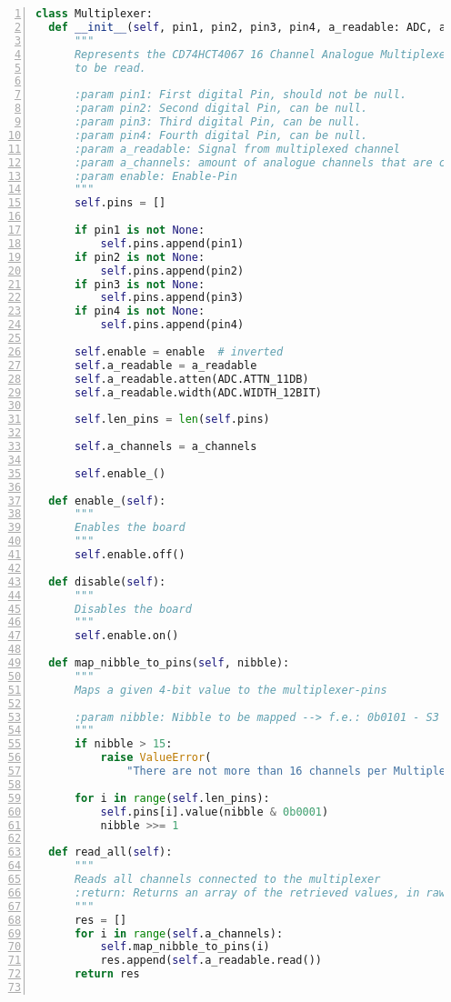\documentclass[paper=a4,12pt]{scrreprt}
\begin{document}
\begin{lstlisting}[caption={Firmware: Multiplexer- und Iterator-Objekt}, captionpos=b, label={listing:multiplexer_class}, language=python, morekeywords={async, await, False, True, None}, numbers=left,
  stepnumber=1]
class Multiplexer:
  def __init__(self, pin1, pin2, pin3, pin4, a_readable: ADC, a_channels, enable: Pin):
      """
      Represents the CD74HCT4067 16 Channel Analogue Multiplexer, with 4 digital pins to select the analogue channel
      to be read.

      :param pin1: First digital Pin, should not be null.
      :param pin2: Second digital Pin, can be null.
      :param pin3: Third digital Pin, can be null.
      :param pin4: Fourth digital Pin, can be null.
      :param a_readable: Signal from multiplexed channel
      :param a_channels: amount of analogue channels that are connected to the board
      :param enable: Enable-Pin
      """
      self.pins = []

      if pin1 is not None:
          self.pins.append(pin1)
      if pin2 is not None:
          self.pins.append(pin2)
      if pin3 is not None:
          self.pins.append(pin3)
      if pin4 is not None:
          self.pins.append(pin4)

      self.enable = enable  # inverted
      self.a_readable = a_readable
      self.a_readable.atten(ADC.ATTN_11DB)
      self.a_readable.width(ADC.WIDTH_12BIT)

      self.len_pins = len(self.pins)

      self.a_channels = a_channels

      self.enable_()

  def enable_(self):
      """
      Enables the board
      """
      self.enable.off()

  def disable(self):
      """
      Disables the board
      """
      self.enable.on()

  def map_nibble_to_pins(self, nibble):
      """
      Maps a given 4-bit value to the multiplexer-pins

      :param nibble: Nibble to be mapped --> f.e.: 0b0101 - S3 = 0, S2 = 1, S1 = 0, S0 = 1
      """
      if nibble > 15:
          raise ValueError(
              "There are not more than 16 channels per Multiplexer (0 to 15)! Pared value: " + str(nibble))

      for i in range(self.len_pins):
          self.pins[i].value(nibble & 0b0001)
          nibble >>= 1

  def read_all(self):
      """
      Reads all channels connected to the multiplexer
      :return: Returns an array of the retrieved values, in raw format
      """
      res = []
      for i in range(self.a_channels):
          self.map_nibble_to_pins(i)
          res.append(self.a_readable.read())
      return res


\end{lstlisting}
\end{document}
